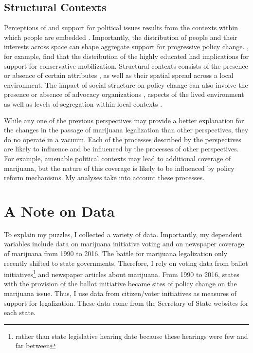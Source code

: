 \subsection{Structural Contexts}

Perceptions of and support for political issues results from the contexts within which people are embedded \citep{blau_1977a,blau_1977b,mcveigh_and_diaz_2009}. Importantly, the distribution of people and their interests across space can shape aggregate support for progressive policy change. \citet{mcveigh_et_al_2014a}, for example, find that the distribution of the highly educated had implications for support for conservative mobilization. Structural contexts consists of the presence or absence of certain attributes \citep{blau_1977a,blau_1977b,blau_and_duncan_1967}, as well as their spatial spread across a local environment. The impact of social structure on policy change can also involve the presence or absence of advocacy organizations \citep{vann_jr_2018,soule_and_olzak_2004}, aspects of the lived environment \citep{olzak_and_soule_2009} as well as levels of segregation within local contexts \citep{andrews_and_seguin_2015,olzak_et_al_1994}. 







While any one of the previous perspectives may provide a better explanation for the changes in the passage of marijuana legalization than other perspectives, they do no operate in a vacuum. Each of the processes described by the perspectives are likely to influence and be influenced by the processes of other perspectives. For example, amenable political contexts may lead to additional coverage of marijuana, but the nature of this coverage is likely to be influenced by policy reform mechanisms. My analyses take into account these processes.


\section{A Note on Data}


To explain my puzzles, I collected a variety of data. Importantly, my dependent variables include data on marijuana initiative voting and on newspaper coverage of marijuana from 1990 to 2016. The battle for marijuana legalization only recently shifted to state governments. Therefore, I rely on voting data from ballot initiatives\footnote{rather than state legislative hearing date because these hearings were few and far between} and newspaper articles about marijuana. From 1990 to 2016, states with the provision of the ballot initiative became sites of policy change on the marijuana issue. Thus, I use data from citizen/voter initiatives as measures of support for legalization. These data come from the Secretary of State websites for each state. 

